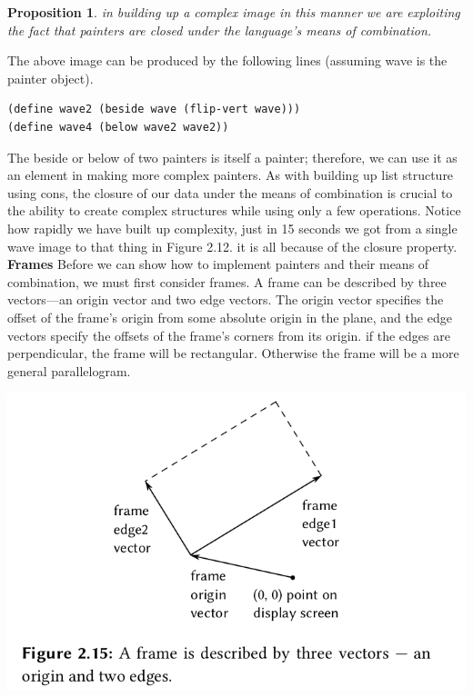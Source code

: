 \documentclass[a4paper,twoside]{article}
\newtheorem{proposition}[theorem]{Proposition}
\numberwithin{equation}{section}
\begin{document}
\begin{proposition}
    in building up a complex image in this manner we are exploiting the fact that painters are closed
    under the language's means of combination.
\end{proposition}
The above image can be produced by the following lines (assuming wave is the painter object).
\begin{lstlisting}
(define wave2 (beside wave (flip-vert wave)))
(define wave4 (below wave2 wave2))
\end{lstlisting}
The beside or below of two painters is itself a painter; therefore, we can use it as an element in
making more complex painters. As with building up list structure using cons, the closure of our data
under the means of combination is crucial to the ability to create complex structures while using only
a few operations. Notice how rapidly we have built up complexity, just in 15 seconds we got from a
single wave image to that thing in Figure 2.12. it is all because of the closure property.\newline
\textbf{Frames}\newline
Before we can show how to implement painters and their means of combination, we must first consider frames.
A frame can be described by three vectors—an origin vector and two edge vectors. The origin vector
specifies the offset of the frame's origin from some absolute origin in the plane, and the edge vectors
specify the offsets of the frame's corners from its origin. if the edges are perpendicular, the frame
will be rectangular. Otherwise the frame will be a more general parallelogram.
\begin{center}
    \includegraphics[scale = 0.5]{assets/frame.png}
\end{center}
\end{document}
